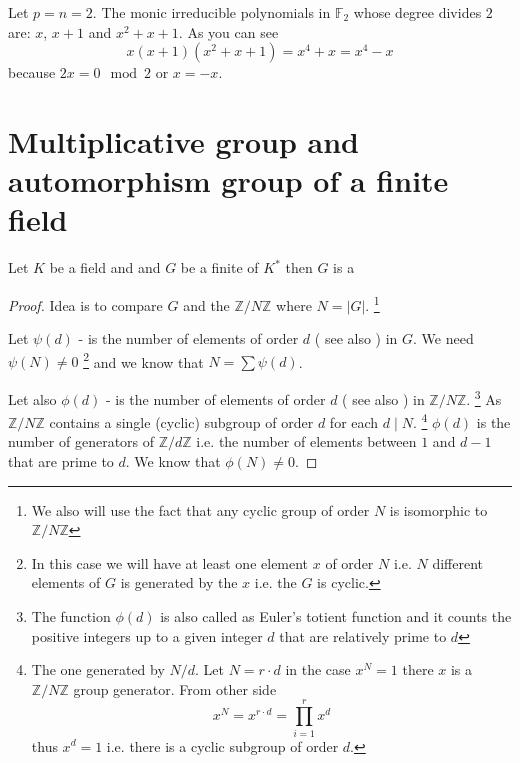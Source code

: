 \begin{example}
  Let $p = n = 2$. The monic irreducible polynomials in $\mathbb{F}_2$
  whose degree divides $2$ are: $x$, $x+1$ and $x^2 +x + 1$.
  As you can see
  \begin{equation}
    x\left(x+1\right)\left(x^2+x+1\right) = x^4 + x = x^4 - x
    \nonumber
  \end{equation}
  because $2x = 0 \mod 2$ or $x = -x$.
\end{example}

\section{Multiplicative group and automorphism group of a finite
  field}
\begin{theorem}
  Let $K$ be a field and and $G$ be a finite  of
  $K^*$ then $G$ is a 
  \begin{proof}
    Idea is to compare $G$ and the 
    $\mathbb{Z}/N\mathbb{Z}$ where $N = \left|G\right|$.
    \footnote{
      We also will use the fact that any cyclic group of order $N$ is
      isomorphic to $\mathbb{Z}/N\mathbb{Z}$
    }

    Let $\psi\left(d\right)$ - is the number of elements of order $d$
    ( see also ) in $G$. We need
    $\psi\left(N\right) \ne 0$
    \footnote{
      In this case we will have at least one element $x$ of order $N$
      i.e. $N$ different elements of $G$ is generated by the $x$
      i.e. the $G$ is cyclic.
    }
    and we know that
    $N = \sum \psi\left(d\right)$.
    
    Let also $\phi\left(d\right)$ - is the number of elements of order $d$
    ( see also ) in $\mathbb{Z}/N\mathbb{Z}$.
    \footnote{      
      The function $\phi\left(d\right)$ is also called as Euler's
      totient function and it 
      counts the positive integers up to a given integer $d$ that are
      relatively prime to $d$ 
    }
    As $\mathbb{Z}/N\mathbb{Z}$ contains a single (cyclic) subgroup of
    order $d$ for each $d \mid N$.
    \footnote{
      The one generated by $N/d$. Let $N = r \cdot d$ in the case
      $x^N = 1$ there $x$ is a $\mathbb{Z}/N\mathbb{Z}$ group
      generator. From other side
      \[
      x^N = x^{r \cdot d} = \prod_{i=1}^r x^d
      \]
      thus $x^d = 1$ i.e. there is a cyclic subgroup of order $d$.
    }
    $\phi\left(d\right)$ is the number of generators of
    $\mathbb{Z}/d\mathbb{Z}$ i.e. the number of elements between $1$
    and $d-1$ that are prime to $d$. We know that
    $\phi\left(N\right) \ne 0$.


\end{proof}
\end{theorem}
